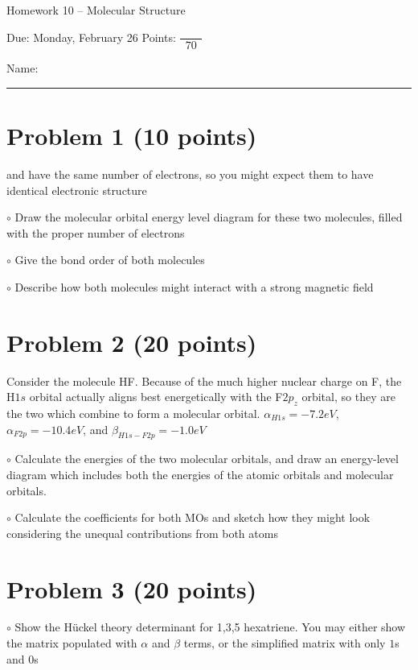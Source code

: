 \documentclass[10pt, letterpaper]{memoir}
\begin{document}
\begin{center}
	{\large Homework 10 -- Molecular Structure}
	
	Due: Monday, February 26 \hspace{3em} Points: ${\dfrac{~}{~~70~~}}$
\end{center}

Name: \rule[-.1mm]{15em}{0.1pt}	
	
	\section*{Problem 1 (10 points)}
	
	 and  have the same number of electrons, so you might expect them to have identical electronic structure
	
	\noindent $\circ$ Draw the molecular orbital energy level diagram for these two molecules, filled with the proper number of electrons
	
	\vspace{30em}
	\noindent $\circ$ Give the bond order of both molecules
	
	\vspace{5em}
	\noindent $\circ$ Describe how both molecules might interact with a strong magnetic field

	\newpage
	\section*{Problem 2 (20 points)}
	
	Consider the molecule HF. Because of the much higher nuclear charge on F, the H$1s$ orbital actually aligns best energetically with the F$2p_z$ orbital, so they are the two which combine to form a molecular orbital. $\alpha_{H1s} = -7.2eV$, $\alpha_{F2p}=-10.4eV$, and $\beta_{H1s-F2p}=-1.0eV$
	
	\noindent $\circ$ Calculate the energies of the two molecular orbitals, and draw an energy-level diagram which includes both the energies of the atomic orbitals and molecular orbitals.
	
	\vspace{27em}
	\noindent $\circ$ Calculate the coefficients for both MOs and sketch how they might look considering the unequal contributions from both atoms
	
	\newpage
	\section*{Problem 3 (20 points)}	
	$\circ$ Show the H\"uckel theory determinant for 1,3,5 hexatriene. You may either show the matrix populated with $\alpha$ and $\beta$ terms, or the simplified matrix with only $1$s and $0$s
	
\end{document}
